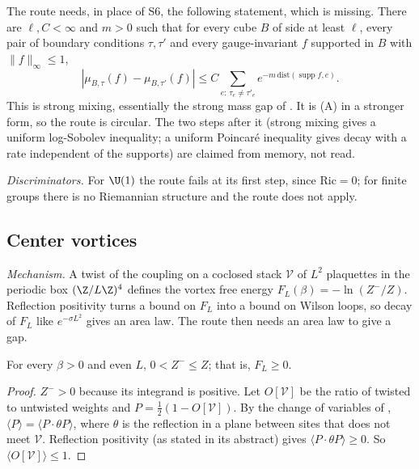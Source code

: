\begin{observation}\label{neg:obs-curv-missing}
The route needs, in place of S6, the following statement, which is missing. There are
$\ell,C<\infty$ and $m>0$ such that for every cube $B$ of side at least $\ell$, every pair of
boundary conditions $\tau,\tau'$ and every gauge-invariant $f$ supported in $B$ with
$\|f\|_\infty\le1$,
\[
|\mu_{B,\tau}(f)-\mu_{B,\tau'}(f)|\le C\sum_{e:\,\tau_e\ne\tau'_e}e^{-m\,\mathrm{dist}(\operatorname{supp}f,e)}.
\]
This is strong mixing, essentially the strong mass gap of \cite[Def.~2.3]{Ch21}. It is (A)
in a stronger form, so the route is circular. The two steps after it (strong mixing gives a
uniform log-Sobolev inequality; a uniform Poincar\'e inequality gives decay with a rate
independent of the supports) are claimed from memory, not read.
\end{observation}

\emph{Discriminators.} For $\U(1)$ the route fails at its first step, since $\mathrm{Ric}=0$;
for finite groups there is no Riemannian structure and the route does not apply.

\subsection{Center vortices}\label{neg:sub-vort}

\emph{Mechanism.} A twist of the coupling on a coclosed stack $\mathcal V$ of $L^2$ plaquettes
in the periodic box $(\Z/L\Z)^4$ defines the vortex free energy $F_L(\beta)=-\ln(Z^-/Z)$.
Reflection positivity turns a bound on $F_L$ into a bound on Wilson loops, so decay of $F_L$
like $e^{-\sigma L^2}$ gives an area law. The route then needs an area law to give a gap.

\begin{lemma}\label{neg:lem-Zminus}
For every $\beta>0$ and even $L$, $0<Z^-\le Z$; that is, $F_L\ge0$.
\end{lemma}

\begin{proof}
$Z^->0$ because its integrand is positive. Let $O[\mathcal V]$ be the ratio of twisted to
untwisted weights and $P=\frac12(1-O[\mathcal V])$. By the change of variables of
\cite[(4), (7)]{KT02}, $\langle P\rangle=\langle P\cdot\theta P\rangle$, where $\theta$ is the
reflection in a plane between sites that does not meet $\mathcal V$. Reflection positivity
\cite{OS78} (as stated in its abstract) gives $\langle P\cdot\theta P\rangle\ge0$. So
$\langle O[\mathcal V]\rangle\le1$.
\end{proof}

